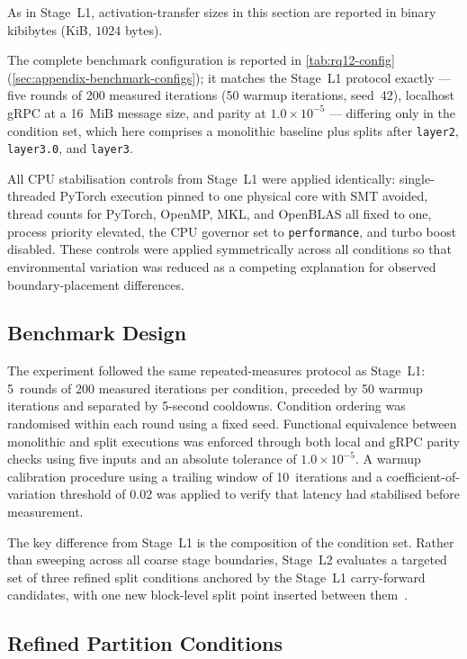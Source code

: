 As in Stage~L1, activation-transfer sizes in this section are reported in binary
kibibytes (KiB, $1024$ bytes).

The complete benchmark configuration is reported in
\cref{tab:rq12-config} (\cref{sec:appendix-benchmark-configs}); it matches the
Stage~L1 protocol exactly --- five rounds of 200 measured iterations (50 warmup
iterations, seed~42), localhost gRPC at a 16~MiB message size, and parity at
$1.0 \times 10^{-5}$ --- differing only in the condition set, which here comprises
a monolithic baseline plus splits after \texttt{layer2}, \texttt{layer3.0}, and
\texttt{layer3}.

All CPU stabilisation controls from Stage~L1 were applied identically: single-threaded PyTorch execution pinned to one physical core with SMT avoided, thread counts for PyTorch, OpenMP, MKL, and OpenBLAS all fixed to one, process priority elevated, the CPU governor set to \texttt{performance}, and turbo boost disabled. These controls were applied symmetrically across all conditions so that environmental variation was reduced as a competing explanation for observed boundary-placement differences.

\subsection{Benchmark Design}
\label{sec:rq12-design}

The experiment followed the same repeated-measures protocol as Stage~L1: 5~rounds of 200 measured iterations per condition, preceded by 50 warmup iterations and separated by 5-second cooldowns. Condition ordering was randomised within each round using a fixed seed. Functional equivalence between monolithic and split executions was enforced through both local and gRPC parity checks using five inputs and an absolute tolerance of $1.0 \times 10^{-5}$. A warmup calibration procedure using a trailing window of 10~iterations and a coefficient-of-variation threshold of 0.02 was applied to verify that latency had stabilised before measurement.

The key difference from Stage~L1 is the composition of the condition set. Rather than sweeping across all coarse stage boundaries, Stage~L2 evaluates a targeted set of three refined split conditions anchored by the Stage~L1 carry-forward candidates, with one new block-level split point inserted between them~\cite{fine_grained_partitioning}.

\subsection{Refined Partition Conditions}
\label{sec:rq12-conditions}

